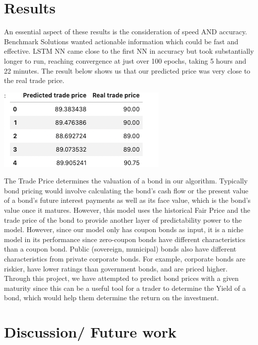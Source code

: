 \documentclass[
  man]{apa6}
\begin{document}
\par

\hypertarget{results}{%
\section{Results}\label{results}}

An essential aspect of these results is the consideration of speed AND accuracy. Benchmark Solutions wanted actionable information which could be fast and effective. LSTM NN came close to the first NN in accuracy but took substantially longer to run, reaching convergence at just over 100 epochs, taking 5 hours and 22 minutes. The result below shows us that our predicted price was very close to the real trade price.

\includegraphics{result.png}

The Trade Price determines the valuation of a bond in our algorithm. Typically bond pricing would involve calculating the bond's cash flow or the present value of a bond's future interest payments as well as its face value, which is the bond's value once it matures. However, this model uses the historical Fair Price and the trade price of the bond to provide another layer of predictability power to the model. However, since our model only has coupon bonds as input, it is a niche model in its performance since zero-coupon bonds have different characteristics than a coupon bond. Public (sovereign, municipal) bonds also have different characteristics from private corporate bonds. For example, corporate bonds are riskier, have lower ratings than government bonds, and are priced higher. Through this project, we have attempted to predict bond prices with a given maturity since this can be a useful tool for a trader to determine the Yield of a bond, which would help them determine the return on the investment.

\hypertarget{discussion-future-work}{%
\section{Discussion/ Future work}\label{discussion-future-work}}
\end{document}
